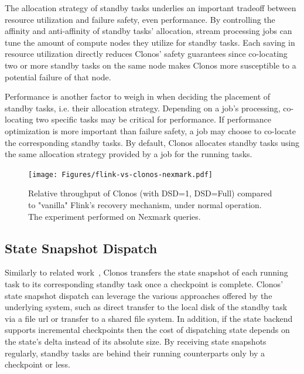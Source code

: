 \documentclass[sigconf]{acmart}
\begin{document}
The allocation strategy of standby tasks underlies an important tradeoff between resource utilization and failure safety, even performance.
By controlling the affinity and anti-affinity of standby tasks' allocation, stream processing jobs can tune the amount of compute nodes they utilize for standby tasks.
Each saving in resource utilization directly reduces Clonos' safety guarantees since co-locating two or more standby tasks on the same node makes Clonos more susceptible to a potential failure of that node.

Performance is another factor to weigh in when deciding the placement of standby tasks, i.e. their allocation strategy.
Depending on a job's processing, co-locating two specific tasks may be critical for performance.
If performance optimization is more important than failure safety, a job may choose to co-locate the corresponding standby tasks.
By default, Clonos allocates standby tasks using the same allocation strategy provided by a job for the running tasks.


\begin{figure}[t]
    \centering
    \texttt{[image: Figures/flink-vs-clonos-nexmark.pdf]}
		\caption{Relative throughput of Clonos (with DSD=1, DSD=Full) compared to "vanilla" Flink's recovery mechanism, under normal operation. The experiment performed on Nexmark queries.}
\label{fig:overhead-nexmark}
\vspace{-2mm}
\end{figure}

\subsection{State Snapshot Dispatch}

Similarly to related work~\cite{Hwang2005HAA, KwonB08}, Clonos transfers the state snapshot of each running task to its corresponding standby task once a checkpoint is complete.
Clonos' state snapshot dispatch can leverage the various approaches offered by the underlying system, such as direct transfer to the local disk of the standby task via a file url or transfer to a shared file system.
In addition, if the state backend supports incremental checkpoints then the cost of dispatching state depends on the state's delta instead of its absolute size.
By receiving state snapshots regularly, standby tasks are behind their running counterparts only by a checkpoint or less.
\end{document}
